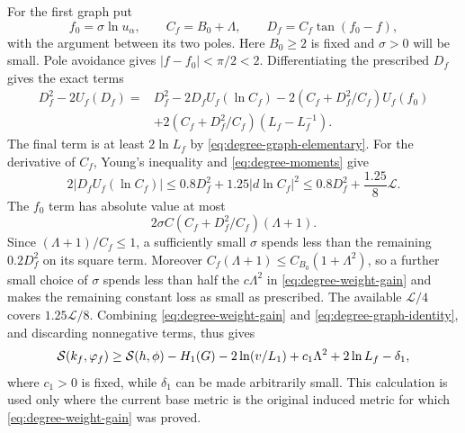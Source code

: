 For the first graph put
\[
      f_0=\sigma\ln u_\alpha,\qquad C_f=B_0+\Lambda,
      \qquad D_f=C_f\tan(f_0-f),
\]
with the argument between its two poles.  Here $B_0\ge2$ is fixed and
$\sigma>0$ will be small.  Pole avoidance gives $|f-f_0|<\pi/2<2$.
Differentiating the prescribed $D_f$ gives the exact terms
\begin{equation}\label{eq:degree-first-graph-differentiation}
 \begin{split}
 D_f^2-2U_f(D_f)
  ={}&D_f^2-2D_fU_f(\ln C_f)
      -2(C_f+D_f^2/C_f)U_f(f_0)\\
     &+2(C_f+D_f^2/C_f)(L_f-L_f^{-1}).
 \end{split}
\end{equation}
The final term is at least $2\ln L_f$ by
\eqref{eq:degree-graph-elementary}.  For the derivative of $C_f$, Young's
inequality and \eqref{eq:degree-moments} give
\[
 2|D_fU_f(\ln C_f)|
   \le0.8D_f^2+1.25|d\ln C_f|^2
   \le0.8D_f^2+\frac{1.25}{8}\mathcal L.
\]
The $f_0$ term has absolute value at most
\[
     2\sigma C(C_f+D_f^2/C_f)(\Lambda+1).
\]
Since $(\Lambda+1)/C_f\le1$, a sufficiently small $\sigma$ spends less
than the remaining $0.2D_f^2$ on its square term.  Moreover
$C_f(\Lambda+1)\le C_{B_0}(1+\Lambda^2)$, so a further small choice of
$\sigma$ spends less than half the $c\Lambda^2$ in
\eqref{eq:degree-weight-gain} and makes the remaining constant loss as
small as prescribed.  The available $\mathcal L/4$ covers
$1.25\mathcal L/8$.  Combining \eqref{eq:degree-weight-gain} and
\eqref{eq:degree-graph-identity}, and discarding nonnegative terms, thus
gives
\begin{equation}\label{eq:degree-first-graph-gain}
 \mathcal S(k_f,\varphi_f)\ge\mathcal S(h,\phi)-H_1(G)-2\ln(v/L_1)
                         +c_1\Lambda^2+2\ln L_f-\delta_1,
\end{equation}
where $c_1>0$ is fixed, while $\delta_1$ can be made arbitrarily small.  This
calculation is used only where the current base metric is the original
induced metric for which \eqref{eq:degree-weight-gain} was proved.

